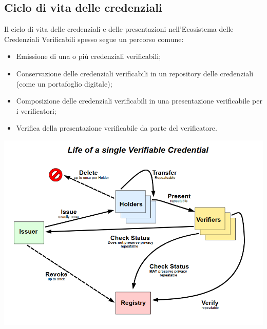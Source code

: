 \subsection{Ciclo di vita delle credenziali}
Il ciclo di vita delle credenziali e delle presentazioni nell'Ecosistema delle Credenziali Verificabili spesso segue un percorso comune:
\begin{itemize}
\item Emissione di una o più credenziali verificabili;
\item Conservazione delle credenziali verificabili in un repository delle credenziali (come un portafoglio digitale);
\item Composizione delle credenziali verificabili in una presentazione verificabile per i verificatori;
\item Verifica della presentazione verificabile da parte del verificatore.
\end{itemize}
\begin{center}
	\includegraphics[scale = 1]{./res/images/Immaginew3c.png}
\end{center}

